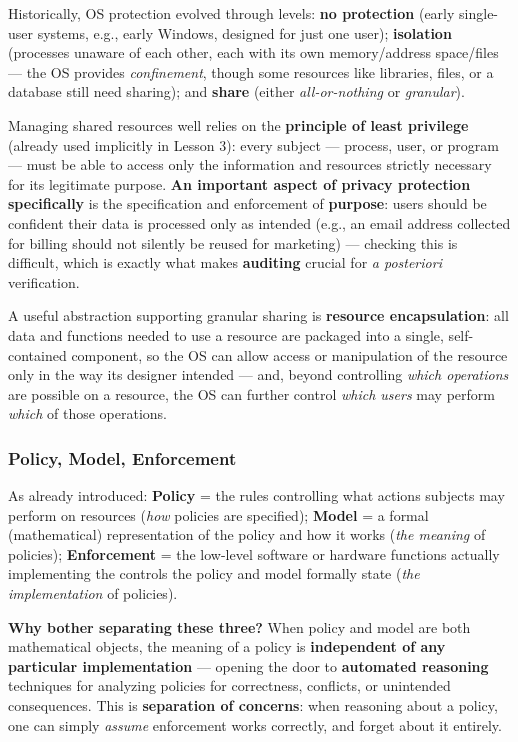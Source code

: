 \documentclass[12pt, a4paper]{article}
\begin{document}
Historically, OS protection evolved through levels: \textbf{no protection} (early single-user systems, e.g., early Windows, designed for just one user); \textbf{isolation} (processes unaware of each other, each with its own memory/address space/files --- the OS provides \emph{confinement}, though some resources like libraries, files, or a database still need sharing); and \textbf{share} (either \emph{all-or-nothing} or \emph{granular}).

Managing shared resources well relies on the \textbf{principle of least privilege} (already used implicitly in Lesson 3): every subject --- process, user, or program --- must be able to access only the information and resources strictly necessary for its legitimate purpose. \textcolor{blue!50!black}{\textbf{An important aspect of privacy protection specifically}} is the specification and enforcement of \textbf{purpose}: users should be confident their data is processed only as intended (e.g., an email address collected for billing should not silently be reused for marketing) --- checking this is difficult, which is exactly what makes \textbf{auditing} crucial for \textit{a posteriori} verification.

A useful abstraction supporting granular sharing is \textbf{resource encapsulation}: all data and functions needed to use a resource are packaged into a single, self-contained component, so the OS can allow access or manipulation of the resource only in the way its designer intended --- and, beyond controlling \emph{which operations} are possible on a resource, the OS can further control \emph{which users} may perform \emph{which} of those operations.

\subsubsection{Policy, Model, Enforcement}
\label{subsec:ac-policy-model-enforcement-08}
As already introduced: \textbf{Policy} = the rules controlling what actions subjects may perform on resources (\emph{how} policies are specified); \textbf{Model} = a formal (mathematical) representation of the policy and how it works (\emph{the meaning} of policies); \textbf{Enforcement} = the low-level software or hardware functions actually implementing the controls the policy and model formally state (\emph{the implementation} of policies).

\textcolor{ForestGreen!60!black}{\textbf{Why bother separating these three?}} When policy and model are both mathematical objects, the meaning of a policy is \textbf{independent of any particular implementation} --- opening the door to \textbf{automated reasoning} techniques for analyzing policies for correctness, conflicts, or unintended consequences. This is \textbf{separation of concerns}: when reasoning about a policy, one can simply \emph{assume} enforcement works correctly, and forget about it entirely.
\end{document}

